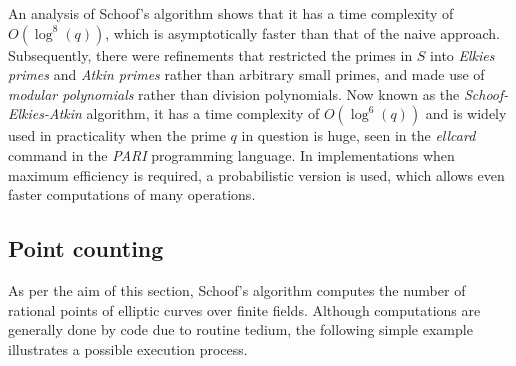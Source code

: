 \documentclass{article}
\newcommand{\rb}[1]{\left( #1 \right)}
\theoremstyle{definition}\newtheorem*{definition}{Definition}
\theoremstyle{definition}\newtheorem*{example}{Example}
\theoremstyle{definition}\newtheorem*{remark}{Remark}
\begin{document}
An analysis of Schoof's algorithm shows that it has a time complexity of $ O\rb{\log^8\rb{q}} $, which is asymptotically faster than that of the naive approach. Subsequently, there were refinements that restricted the primes in $ S $ into \emph{Elkies primes} and \emph{Atkin primes} rather than arbitrary small primes, and made use of \emph{modular polynomials} rather than division polynomials. Now known as the \emph{Schoof-Elkies-Atkin} algorithm, it has a time complexity of $ O\rb{\log^6\rb{q}} $ and is widely used in practicality when the prime $ q $ in question is huge, seen in the \emph{ellcard} command in the \emph{PARI} programming language. In implementations when maximum efficiency is required, a probabilistic version is used, which allows even faster computations of many operations.

\pagebreak

\subsection{Point counting}

As per the aim of this section, Schoof's algorithm computes the number of rational points of elliptic curves over finite fields. Although computations are generally done by code due to routine tedium, the following simple example illustrates a possible execution process.
\end{document}
